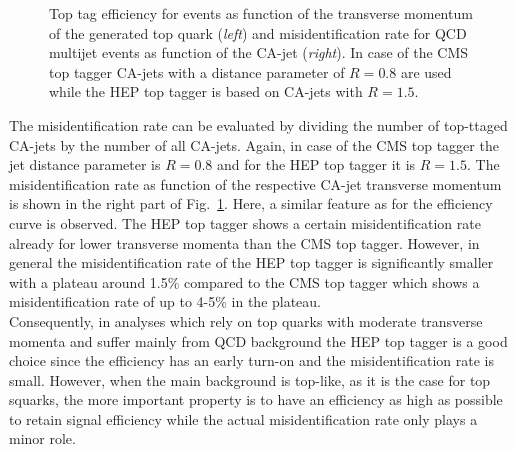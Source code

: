 \begin{description}
\begin{figure}[!t]
{\begin{tabular}{cc}
  \end{tabular}}
  \caption{Top tag efficiency for \ttbar events as function of the transverse momentum of the generated top quark (\textit{left}) and misidentification rate for QCD multijet events as function of the CA-jet \pt (\textit{right}). In case of the CMS top tagger CA-jets with a distance parameter of $R=0.8$ are used while the HEP top tagger is based on CA-jets with $R=1.5$.}
  \label{fig:stop_top_eff}
\end{figure} 
The misidentification rate can be evaluated by dividing the number of top-ttaged CA-jets by the number of all CA-jets. Again, in case of the CMS top tagger the jet distance parameter is $R=0.8$ and for the HEP top tagger it is $R=1.5$. The misidentification rate as function of the respective CA-jet transverse momentum is shown in the right part of Fig.~\ref{fig:stop_top_eff}. Here, a similar feature as for the efficiency curve is observed. The HEP top tagger shows a certain misidentification rate already for lower transverse momenta than the CMS top tagger. However, in general the misidentification rate of the HEP top tagger is significantly smaller with a plateau around 1.5\% compared to the CMS top tagger which shows a misidentification rate of up to 4-5\% in the plateau. \\
Consequently, in analyses which rely on top quarks with moderate transverse momenta and suffer mainly from QCD background the HEP top tagger is a good choice since the efficiency has an early turn-on and the misidentification rate is small. However, when the main background is top-like, as it is the case for top squarks, the more important property is to have an efficiency as high as possible to retain signal efficiency while the actual misidentification rate only plays a minor role. 
\end{description}
